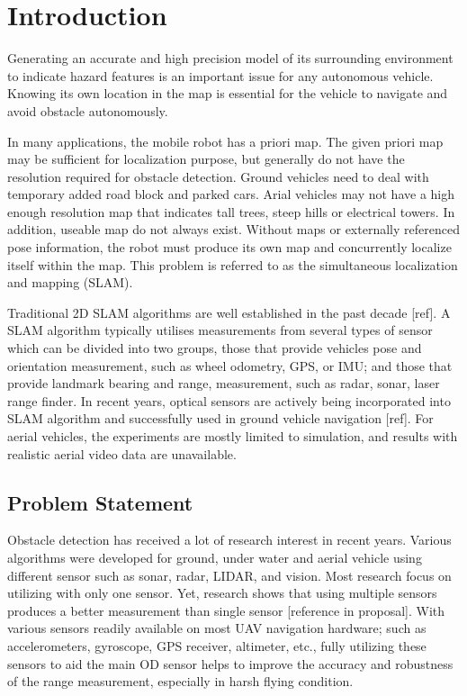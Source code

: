 \chapter{Introduction}\label{ch:intro}

Generating an accurate and high precision model of its surrounding 
environment to indicate hazard features is an important issue for any 
autonomous vehicle. Knowing its own location in the map is essential for 
the vehicle to navigate and avoid obstacle autonomously. 

In many applications, the mobile robot has a priori map. The given 
priori map may be sufficient for localization purpose, but generally do 
not have the resolution required for obstacle detection. Ground vehicles 
need to deal with temporary added road block and parked cars. Arial 
vehicles may not have a high enough resolution map that indicates tall 
trees, steep hills or electrical towers. In addition, useable map do not 
always exist. Without maps or externally referenced pose information, 
the robot must produce its own map and concurrently localize itself 
within the map. This problem is referred to as the simultaneous 
localization and mapping (SLAM). 

Traditional 2D SLAM algorithms are well established in the past decade
[ref]. A SLAM algorithm typically utilises measurements from several
types of sensor which can be divided into two groups, those that
provide vehicles pose and orientation measurement, such as wheel
odometry, GPS, or IMU; and those that provide landmark bearing and
range, measurement, such as radar, sonar, laser range finder. In
recent years, optical sensors are actively being incorporated into
SLAM algorithm and successfully used in ground vehicle navigation
[ref]. For aerial vehicles, the experiments are mostly limited to
simulation, and results with realistic aerial video data are
unavailable.

\section{Problem Statement}\label{section:ProblemStatement}
Obstacle detection has received a lot of research interest in recent 
years. Various algorithms were developed for ground, under water and 
aerial vehicle using different sensor such as sonar, radar, LIDAR, and 
vision. Most research focus on utilizing with only one sensor. Yet, 
research shows that using multiple sensors produces a better measurement 
than single sensor [reference in proposal]. With various sensors 
readily available on most UAV navigation hardware; such as 
accelerometers, gyroscope, GPS receiver, altimeter, etc., fully 
utilizing these sensors to aid the main OD sensor helps to improve the 
accuracy and robustness of the range measurement, especially in harsh 
flying condition. 

